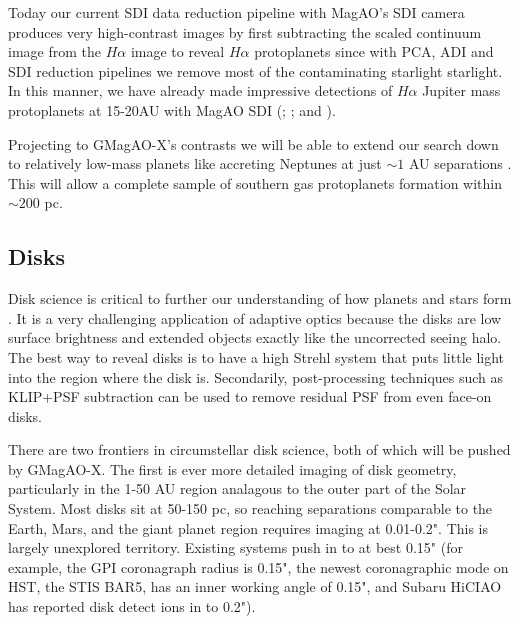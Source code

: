 \documentclass[12pt,preprint]{aastex}
\begin{document}
Today our current SDI data reduction pipeline with MagAO's SDI camera produces very high-contrast images by first subtracting the scaled continuum image from the $H\alpha$ image to reveal $H\alpha$ protoplanets since with PCA, ADI and SDI reduction pipelines we remove most of the contaminating starlight starlight. In this manner, we have already made impressive detections of $H\alpha$ Jupiter mass protoplanets at 15-20AU with MagAO SDI (\citet[HD142527 B,][]{2014ApJ...781L..30C}; \citet[LkCa 15 b,][]{2015Natur.527..342S}; and \citet[PDS 70 b,][]{2018ApJ...863L...8W}). 

Projecting to  GMagAO-X's contrasts we will be able to extend our search down to relatively low-mass planets like accreting Neptunes at just $\sim1$ AU separations \citep{2019BAAS...51c.527S}. This will allow a complete sample of southern gas protoplanets formation within $\sim200$ pc. 

% 







\subsection{ Disks }
Disk science is critical to further our understanding of how planets and stars form \citep[see Astro2020 science whitepapers:][]{2019BAAS...51c.346J, 2019BAAS...51c.445W, 2019BAAS...51c.566D}.
It is a very challenging application of adaptive optics because
the disks are low surface brightness and extended objects exactly like the
uncorrected seeing halo. The best way to reveal disks is to have a high Strehl
system that puts little light into the region where the disk is. Secondarily,
post-processing techniques such as KLIP+PSF subtraction can be used to remove
residual PSF from even face-on disks.

There are two frontiers in circumstellar disk science, both of which will be
pushed by GMagAO-X. The first is ever more detailed imaging of disk geometry,
particularly in the 1-50 AU region analagous to the outer part of the Solar
System. Most disks sit at 50-150 pc, so reaching separations comparable to the Earth, Mars, and the giant
planet region requires imaging at 0.01-0.2". This is largely unexplored
territory. Existing systems push in to at best 0.15" (for example, the GPI
coronagraph radius is 0.15", the newest coronagraphic mode on HST, the STIS
BAR5, has an inner working angle of 0.15", and Subaru HiCIAO has reported disk
detect ions in to 0.2").  
\end{document}
